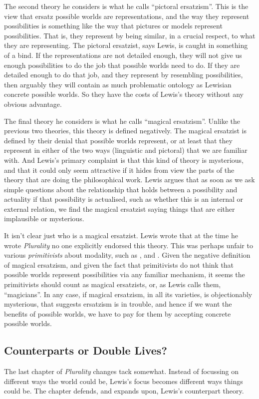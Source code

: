 The second theory he considers is what he calls ``pictoral ersatzism''. This is the view that ersatz possible worlds are representations, and the way they represent possibilities is something like the way that pictures or models represent possibilities. That is, they represent by being similar, in a crucial respect, to what they are representing. The pictoral ersatzist, says Lewis, is caught in something of a bind. If the representations are not detailed enough, they will not give us enough possibilities to do the job that possible worlds need to do. If they are detailed enough to do that job, and they represent by resembling possibilities, then arguably they will contain as much problematic ontology as Lewisian concrete possible worlds. So they have the costs of Lewis's theory without any obvious advantage.

The final theory he considers is what he calls ``magical ersatzism''. Unlike the previous two theories, this theory is defined negatively. The magical ersatzist is defined by their denial that possible worlds represent, or at least that they represent in either of the two ways (linguistic and pictoral) that we are familiar with. And Lewis's primary complaint is that this kind of theory is mysterious, and that it could only seem attractive if it hides from view the parts of the theory that are doing the philosophical work. Lewis argues that as soon as we ask simple questions about the relationship that holds between a possibility and actuality if that possibility is actualised, such as whether this is an internal or external relation, we find the magical ersatzist saying things that are either implausible or mysterious.

It isn't clear just who is a magical ersatzist. Lewis wrote that at the time he wrote \textit{Plurality} no one explicitly endorsed this theory. This was perhaps unfair to various \textit{primitivists} about modality, such as \citet{Adams1974}, \citet{Plantinga1974} and \citet{Stalnaker1976-STAPW}. Given the negative definition of magical ersatzism, and given the fact that primitivists do not think that possible worlds represent possibilities via any familiar mechanism, it seems the primitivists should count as magical ersatzists, or, as Lewis calls them, ``magicians''. In any case, if magical ersatzism, in all its varieties, is objectionably mysterious, that suggests ersatzism is in trouble, and hence if we want the benefits of possible worlds, we have to pay for them by accepting concrete possible worlds.

\subsection{Counterparts or Double Lives?} The last chapter of \textit{Plurality} changes tack somewhat. Instead of focussing on different ways the world could be, Lewis's focus becomes different ways things could be. The chapter defends, and expands upon, Lewis's counterpart theory.

